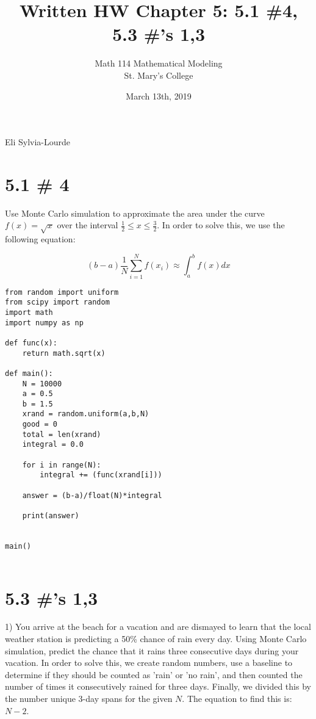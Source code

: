 \documentclass[12pt]{article} %
\title{Written HW Chapter 5: 5.1 \#4, 5.3 \#'s 1,3 }
\author{Math 114 Mathematical Modeling\\St. Mary's College}
\date{March 13th, 2019}
\newcommand{\authors}{Eli Sylvia-Lourde}
\begin{document}
\hfill\authors %
{\let\newpage\relax\maketitle} %

\section*{5.1 \# 4}

Use Monte Carlo simulation to approximate the area under the curve $f(x)= \sqrt{x}$ over the interval $\frac{1}{2} \le x \le \frac{3}{2}.$ In order to solve this, we use the following equation:


\[(b-a)\frac{1}{N}\sum_{i=1}^{N}f(x_{i})\approx\int_a^b f(x)dx \]

\begin{Verbatim}[baselinestretch= .8]
from random import uniform
from scipy import random
import math
import numpy as np

def func(x):
    return math.sqrt(x)

def main():
    N = 10000
    a = 0.5
    b = 1.5
    xrand = random.uniform(a,b,N)
    good = 0
    total = len(xrand)
    integral = 0.0

    for i in range(N):
        integral += (func(xrand[i]))

    answer = (b-a)/float(N)*integral

    print(answer)


main()


\end{Verbatim}

















\section*{5.3 \#'s 1,3}
1) You arrive at the beach for a vacation and are dismayed to learn that the local weather station is predicting a 50\% chance of rain every day. Using Monte Carlo simulation, predict the chance that it rains three consecutive days during your vacation. In order to solve this, we create random numbers, use a baseline to determine if they should be counted as 'rain' or 'no rain', and then counted the number of times it consecutively rained for three days. Finally, we divided this by the number unique 3-day spans for the given $N$. The equation to find this is: $N-2$.
\end{document}
